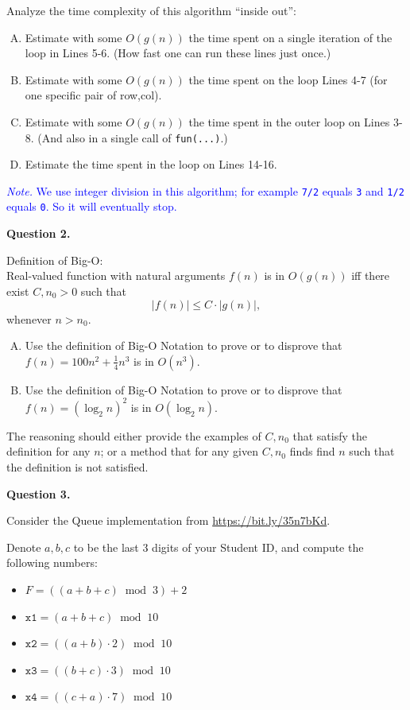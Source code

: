 \documentclass[a4paper,12pt]{article}
\begin{document}
Analyze the time complexity of this algorithm 
``inside out'':

\begin{enumerate}[(A)]
\item Estimate with some $O(g(n))$ the time spent 
on a single iteration of the loop in 
Lines 5-6. (How fast one can run these lines
just once.)
\item Estimate with some $O(g(n))$ the time spent
on the loop Lines 4-7 (for one specific pair 
of row,col). 
\item Estimate with some $O(g(n))$ the 
time spent in the outer loop on Lines 3-8. 
(And also in a single call of {\tt fun(...)}.)
\item Estimate the time spent in the loop 
on Lines 14-16. 
\end{enumerate}


\textcolor{blue}{\footnotesize
{\em Note.} We use integer division in this algorithm; 
for example {\tt 7/2} equals {\tt 3} and {\tt 1/2} equals {\tt 0}. So it will eventually stop.
}






\vspace{20pt}
{\bf Question 2.} 

Definition of Big-O:\\
Real-valued function with natural arguments $f(n)$ is in 
$O(g(n))$ iff there exist $C,n_0 >0$ such that
$$|f(n)| \leq C \cdot |g(n)|,$$
whenever $n > n_0$. 

\begin{enumerate}[(A)]
\item Use the definition of Big-O Notation to 
prove or to disprove that $f(n) = 100n^2 + \frac{1}{4}n^3$
is in $O(n^3)$. 
\item Use the definition of Big-O Notation to 
prove or to disprove that $f(n) = (\log_2 n)^2$
is in $O(\log_2 n)$. 
\end{enumerate}

The reasoning should either provide the examples of $C,n_0$ 
that satisfy the definition for any $n$; or a method that 
for any given $C,n_0$ finds find $n$ such that the definition is not satisfied.




\vspace{20pt}
{\bf Question 3.} 

Consider the Queue implementation from \url{https://bit.ly/35n7bKd}.

Denote $a,b,c$ to be the last $3$ digits of your Student ID, and compute the following numbers: 
\begin{itemize}
\item $F = ((a+b+c)\;\operatorname{mod}\;3) + 2$
\item $\mathtt{x1} = (a+b+c)\;\operatorname{mod}\;10$
\item $\mathtt{x2} = ((a+b) \cdot 2)\;\operatorname{mod}\;10$
\item $\mathtt{x3} = ((b+c) \cdot 3)\;\operatorname{mod}\;10$
\item $\mathtt{x4} = ((c+a) \cdot 7)\;\operatorname{mod}\;10$
\end{itemize}
\end{document}
